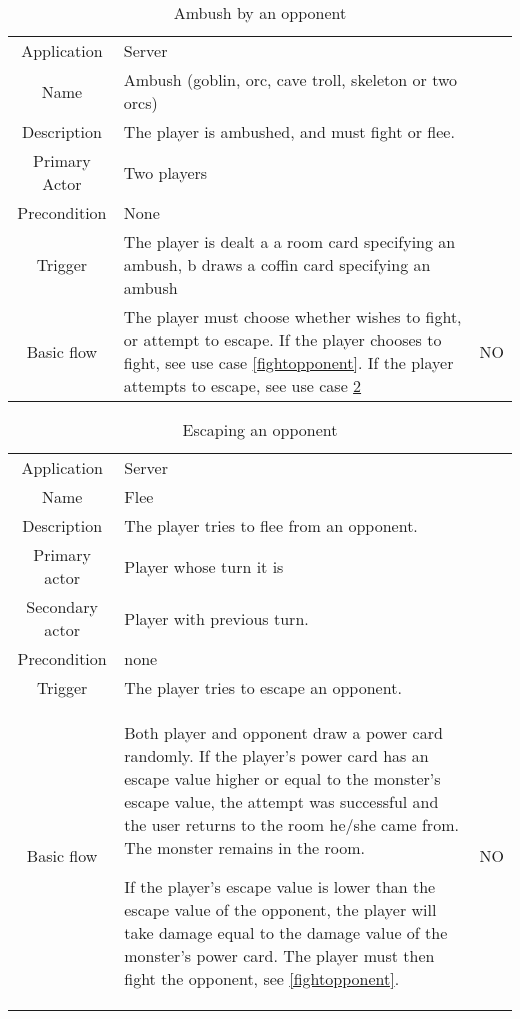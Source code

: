 \documentclass[a4paper,10pt]{report}
\begin{document}
\begin{table}
\caption{Ambush by an opponent}
\label{ambushopponent}
\begin{tabular}{|c| p{9cm}|c}
\hline
Application & Server & \\
Name & Ambush (goblin, orc, cave troll, skeleton or two orcs) & \\
Description & The player is ambushed, and must fight or flee. & \\
Primary Actor & Two players & \\
Precondition & None & \\
Trigger & The player is dealt a a room card specifying an ambush, b draws a coffin card specifying an ambush & \\ \hline
Basic flow & The player must choose whether wishes to fight, or attempt to escape. If the player chooses to fight, see use case \ref{fightopponent}. If the player attempts to escape, see use case \ref{escape} & NO\\
\hline
\end{tabular}
\end{table}


\begin{table}
\caption{Escaping an opponent}
\label{escape}
\begin{tabular}{|c| p{9cm}|c}
\hline
Application & Server & \\
Name & Flee & \\
Description & The player tries to flee from an opponent. & \\
Primary actor & Player whose turn it is & \\
Secondary actor & Player with previous turn. & \\
Precondition & none & \\
Trigger & The player tries to escape an opponent. & \\ \hline
Basic flow & Both player and opponent draw a power card randomly. If the player's power card has an escape value higher or equal to the monster's escape value, the attempt was successful and the user returns to the room he/she came from. The monster remains in the room. 

If the player's escape value is lower than the escape value of the opponent, the player will take damage equal to the damage value of the monster's power card. The player must then fight the opponent, see \ref{fightopponent}.
& NO \\

\hline
\end{tabular}
\end{table}
\end{document}

